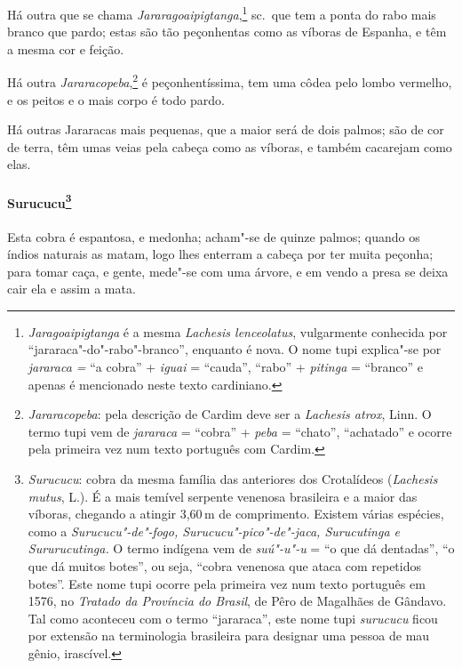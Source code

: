  Há outra que se chama \textit{Jararagoaipigtanga},\footnote{ \textit{Jaragoaipigtanga} 
é a mesma \textit{Lachesis lenceolatus}, vulgarmente conhecida por ``jararaca"-do"-rabo"-branco'', enquanto é nova.
O nome tupi explica"-se por \textit{jararaca =} ``a cobra'' + \textit{iguai} = 
``cauda'', ``rabo'' + \textit{pitinga} = ``branco'' e apenas é
mencionado neste texto cardiniano.} sc.~que tem a ponta do rabo mais
branco que pardo; estas são tão peçonhentas como as víboras de Espanha,
e têm a mesma cor e feição.

 Há outra \textit{Jararacopeba},\footnote{ \textit{Jararacopeba}: pela
descrição de Cardim deve ser a \textit{Lachesis atrox}, Linn. O termo
tupi vem de \textit{jararaca} = ``cobra'' + \textit{peba} = 
``chato'', ``achatado'' e ocorre pela primeira vez num
texto português com Cardim.} é peçonhentíssima, tem uma côdea pelo
lombo vermelho, e os peitos e o mais corpo é todo pardo.

 Há outras Jararacas mais pequenas, que a maior será de dois palmos; são
de cor de terra, têm umas veias pela cabeça como as víboras, e também
cacarejam como elas.

\paragraph{Surucucu\footnote{ \textit{Surucucu}: cobra da mesma
família das anteriores dos Crotalídeos (\textit{Lachesis mutus}, L.).
É a mais temível serpente venenosa brasileira e a maior das víboras,
chegando a atingir 3,60\,m de comprimento. Existem várias espécies, como
a \textit{Surucucu"-de"-fogo, Surucucu"-pico"-de"-jaca, Surucutinga e
Sururucutinga.} O termo indígena vem de \textit{suú"-u"-u} = ``o que dá
dentadas'', ``o que dá muitos botes'', ou seja, ``cobra venenosa que ataca
com repetidos botes''. Este nome tupi ocorre pela primeira vez num texto
português em 1576, no \textit{Tratado da Província do Brasil}, de Pêro de
Magalhães de Gândavo. Tal como aconteceu com o termo ``jararaca'', este
nome tupi \textit{surucucu} ficou por extensão na terminologia
brasileira para designar uma pessoa de mau gênio, irascível.}} 
Esta cobra é espantosa, e medonha; acham"-se de quinze
palmos; quando os índios naturais as matam, logo lhes enterram a cabeça
por ter muita peçonha; para tomar caça, e gente, mede"-se com uma
árvore, e em vendo a presa se deixa cair ela e assim a mata. 

